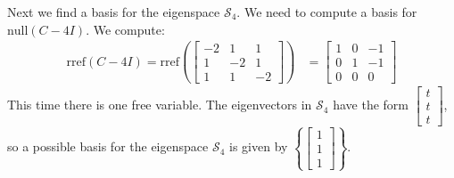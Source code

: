 \documentclass{ximera}
\begin{document}
\begin{explanation}
Next we find a basis for the eigenspace $\mathcal{S}_4$.  We need to compute a basis for $\mbox{null}(C-4I)$.  We compute:
\begin{align*}\mbox{rref}(C-4I)=\mbox{rref}\left(\begin{bmatrix} -2 & 1 & 1\\ 1 & -2 & 1\\ 1 & 1 & -2\end{bmatrix}\right)&=\begin{bmatrix} 1 & 0 & -1\\ 0 & 1 & -1\\ 0 & 0 & 0\end{bmatrix}
\end{align*}
This time there is one free variable.  %
The eigenvectors in $\mathcal{S}_4$ have the form $\begin{bmatrix}t\\t\\t\end{bmatrix}$, so a possible basis for the eigenspace $\mathcal{S}_4$ is given by $\left\{\begin{bmatrix}1\\1\\1\end{bmatrix}\right\}$.
\end{explanation}
\end{document}
